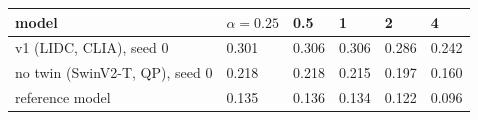 \begin{tabular}{llllll}
\toprule
model & $\alpha=0.25$ & 0.5 & 1 & 2 & 4 \\
\midrule
v1 (LIDC, CLIA), seed 0 & 0.301 & 0.306 & 0.306 & 0.286 & 0.242 \\
no twin (SwinV2-T, QP), seed 0 & 0.218 & 0.218 & 0.215 & 0.197 & 0.160 \\
reference model & 0.135 & 0.136 & 0.134 & 0.122 & 0.096 \\
\bottomrule
\end{tabular}
